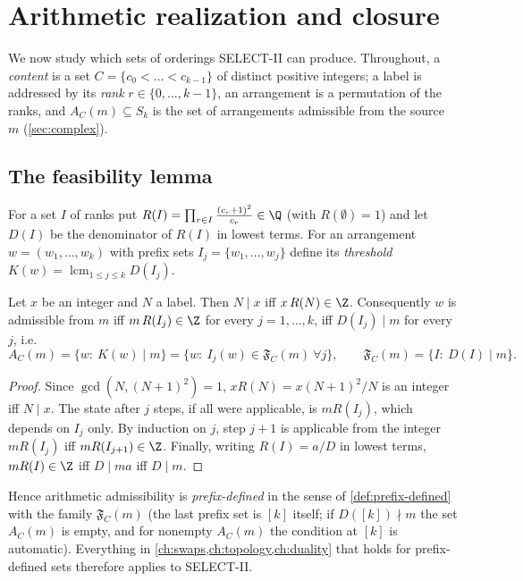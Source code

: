 \chapter{Arithmetic realization and closure}\label{ch:arith}

We now study which sets of orderings SELECT-II can produce. Throughout, a \emph{content} is a set $C=\{c_0<\dots<c_{k-1}\}$ of distinct positive integers; a label is addressed by its \emph{rank} $r\in\{0,\dots,k-1\}$, an arrangement is a permutation of the ranks, and $A_C(m)\subseteq S_k$ is the set of arrangements admissible from the source $m$ (\cref{sec:complex}).

\section{The feasibility lemma}
For a set $I$ of ranks put $R(I)=\prod_{r\in I}\frac{(c_r+1)^2}{c_r}\in\Q$ (with $R(\emptyset)=1$) and let $D(I)$ be the denominator of $R(I)$ in lowest terms. For an arrangement $w=(w_1,\dots,w_k)$ with prefix sets $I_j=\{w_1,\dots,w_j\}$ define its \emph{threshold} $K(w)=\operatorname{lcm}_{1\le j\le k}D(I_j)$.

\begin{lemma}\label{lem:F}
Let $x$ be an integer and $N$ a label. Then $N\mid x$ iff $x\,R(N)\in\Z$. Consequently $w$ is admissible from $m$ iff $m\,R(I_j)\in\Z$ for every $j=1,\dots,k$, iff $D(I_j)\mid m$ for every $j$, i.e.
\[
A_C(m)=\{w:\ K(w)\mid m\}=\{w:\ I_j(w)\in\mathfrak F_C(m)\ \forall j\},\qquad \mathfrak F_C(m)=\{I:\ D(I)\mid m\}.
\]
\end{lemma}
\begin{proof}
Since $\gcd(N,(N{+}1)^2)=1$, $xR(N)=x(N{+}1)^2/N$ is an integer iff $N\mid x$. The state after $j$ steps, if all were applicable, is $mR(I_j)$, which depends on $I_j$ only. By induction on $j$, step $j{+}1$ is applicable from the integer $mR(I_j)$ iff $mR(I_{j+1})\in\Z$. Finally, writing $R(I)=a/D$ in lowest terms, $mR(I)\in\Z$ iff $D\mid ma$ iff $D\mid m$.
\end{proof}

Hence arithmetic admissibility is \emph{prefix-defined} in the sense of \cref{def:prefix-defined} with the family $\mathfrak F_C(m)$ (the last prefix set is $[k]$ itself; if $D([k])\nmid m$ the set $A_C(m)$ is empty, and for nonempty $A_C(m)$ the condition at $[k]$ is automatic). Everything in \cref{ch:swaps,ch:topology,ch:duality} that holds for prefix-defined sets therefore applies to SELECT-II.

